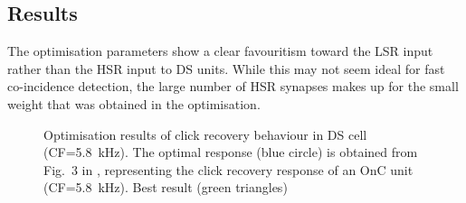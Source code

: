 

\subsection{Results}



The optimisation parameters show a clear favouritism toward the LSR input rather
than the HSR input to DS units. While this may not seem ideal for fast
co-incidence detection, the large number of HSR synapses makes up for the small
weight that was obtained in the optimisation.

\begin{figure}[htb!]
  \centering
\caption{Optimisation results of click recovery behaviour in DS cell (CF=5.8~kHz). The optimal response (blue circle) is obtained from Fig.~3 in \citet{BackoffPalombiEtAl:1997}, representing the click recovery response of an OnC unit (CF=5.8~kHz).  Best result (green triangles) } \label{fig:DS_ClickRecovery_result}  
\end{figure}










